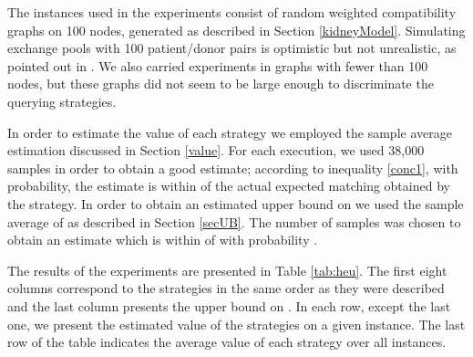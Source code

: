 \documentclass[12pt]{article}
\begin{document}
		The instances used in the experiments consist of random weighted compatibility graphs on 100 nodes, generated as described in Section \ref{kidneyModel}. Simulating exchange pools with 100 patient/donor pairs is optimistic but not unrealistic, as pointed out in \cite{roth3}. We also carried experiments in graphs with fewer than 100 nodes, but these graphs did not seem to be large enough to discriminate the querying strategies. 
		
		In order to estimate the value of each strategy we employed the sample average estimation discussed in Section \ref{value}. For each execution, we used 38,000 samples in order to obtain a good estimate; according to inequality \eqref{conc1}, with  probability, the estimate is within  of the actual expected matching obtained by the strategy. In order to obtain an estimated upper bound on  we used the sample average of  as described in Section \ref{secUB}. The number of samples was chosen to obtain an estimate which is within  of  with probability . 
		
		The results of the experiments are presented in Table \ref{tab:heu}. The first eight columns correspond to the strategies in the same order as they were described and the last column presents the upper bound  on . In each row, except the last one, we present the estimated value of the strategies on a given instance. The last row of the table indicates the average value of each strategy over all instances. 		
		
\end{document}
